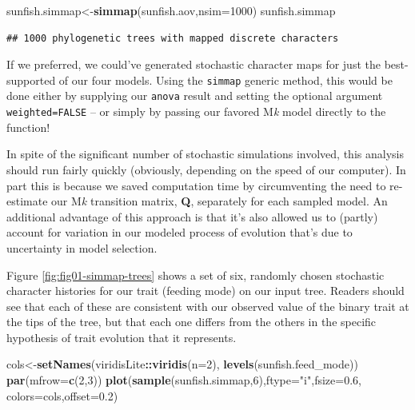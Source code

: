 \documentclass[fleqn,10pt,lineno]{wlpeerj} %
\newenvironment{Shaded}{\begin{snugshade}}{\end{snugshade}}
\newcommand{\AttributeTok}[1]{\textcolor[rgb]{0.13,0.29,0.53}{#1}}
\newcommand{\DecValTok}[1]{\textcolor[rgb]{0.00,0.00,0.81}{#1}}
\newcommand{\FloatTok}[1]{\textcolor[rgb]{0.00,0.00,0.81}{#1}}
\newcommand{\FunctionTok}[1]{\textcolor[rgb]{0.13,0.29,0.53}{\textbf{#1}}}
\newcommand{\NormalTok}[1]{#1}
\newcommand{\OtherTok}[1]{\textcolor[rgb]{0.56,0.35,0.01}{#1}}
\newcommand{\SpecialCharTok}[1]{\textcolor[rgb]{0.81,0.36,0.00}{\textbf{#1}}}
\newcommand{\StringTok}[1]{\textcolor[rgb]{0.31,0.60,0.02}{#1}}
\begin{document}
\begin{Shaded}
\begin{Highlighting}[]
\NormalTok{sunfish.simmap}\OtherTok{\textless{}{-}}\FunctionTok{simmap}\NormalTok{(sunfish.aov,}\AttributeTok{nsim=}\DecValTok{1000}\NormalTok{)}
\NormalTok{sunfish.simmap}
\end{Highlighting}
\end{Shaded}

\begin{verbatim}
## 1000 phylogenetic trees with mapped discrete characters
\end{verbatim}

If we preferred, we could've generated stochastic character maps for just the best-supported of our four models. Using the \texttt{simmap} generic method, this would be done either by supplying our \texttt{anova} result and setting the optional argument \texttt{weighted=FALSE} -- or simply by passing our favored M\emph{k} model directly to the function!

In spite of the significant number of stochastic simulations involved, this analysis should run fairly quickly (obviously, depending on the speed of our computer). In part this is because we saved computation time by circumventing the need to re-estimate our M\emph{k} transition matrix, \textbf{Q}, separately for each sampled model. An additional advantage of this approach is that it's also allowed us to (partly) account for variation in our modeled process of evolution that's due to uncertainty in model selection.

Figure \ref{fig:fig01-simmap-trees} shows a set of six, randomly chosen stochastic character histories for our trait (feeding mode) on our input tree. Readers should see that each of these are consistent with our observed value of the binary trait at the tips of the tree, but that each one differs from the others in the specific hypothesis of trait evolution that it represents.

\begin{Shaded}
\begin{Highlighting}[]
\NormalTok{cols}\OtherTok{\textless{}{-}}\FunctionTok{setNames}\NormalTok{(viridisLite}\SpecialCharTok{::}\FunctionTok{viridis}\NormalTok{(}\AttributeTok{n=}\DecValTok{2}\NormalTok{),}
  \FunctionTok{levels}\NormalTok{(sunfish.feed\_mode))}
\FunctionTok{par}\NormalTok{(}\AttributeTok{mfrow=}\FunctionTok{c}\NormalTok{(}\DecValTok{2}\NormalTok{,}\DecValTok{3}\NormalTok{))}
\FunctionTok{plot}\NormalTok{(}\FunctionTok{sample}\NormalTok{(sunfish.simmap,}\DecValTok{6}\NormalTok{),}\AttributeTok{ftype=}\StringTok{"i"}\NormalTok{,}\AttributeTok{fsize=}\FloatTok{0.6}\NormalTok{,}
  \AttributeTok{colors=}\NormalTok{cols,}\AttributeTok{offset=}\FloatTok{0.2}\NormalTok{)}
\end{Highlighting}
\end{Shaded}
\end{document}

